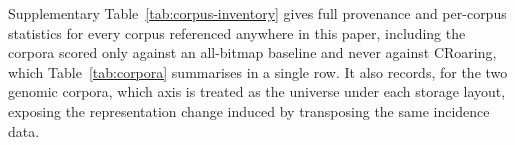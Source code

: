 \label{note:corpora}

Supplementary Table~\ref{tab:corpus-inventory} gives full provenance and per-corpus statistics for
every corpus referenced anywhere in this paper, including the corpora scored only against an
all-bitmap baseline and never against CRoaring, which Table~\ref{tab:corpora} summarises in a single
row. It also records, for the two genomic corpora, which axis is treated as the universe under each
storage layout, exposing the representation change induced by transposing the same incidence data.

\clearpage
\begingroup
\scriptsize
\setlength{\tabcolsep}{2.2pt}
\renewcommand\arraystretch{1.0}
